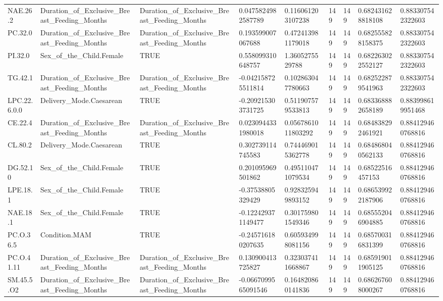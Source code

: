 \begin{longtable}{lllllllll}
NAE.26.2 & Duration\_of\_Exclusive\_Breast\_Feeding\_Months & Duration\_of\_Exclusive\_Breast\_Feeding\_Months & 0.0475824982587789 & 0.116061203107238 & 149 & 149 & 0.682431628818108 & 0.883307542322603 \\
PC.32.0 & Duration\_of\_Exclusive\_Breast\_Feeding\_Months & Duration\_of\_Exclusive\_Breast\_Feeding\_Months & 0.193599007067688 & 0.472413981179018 & 149 & 149 & 0.682555828158375 & 0.883307542322603 \\
PI.32.0 & Sex\_of\_the\_Child.Female & TRUE & 0.558099310648757 & 1.3605275529788 & 149 & 149 & 0.682263022552127 & 0.883307542322603 \\
TG.42.1 & Duration\_of\_Exclusive\_Breast\_Feeding\_Months & Duration\_of\_Exclusive\_Breast\_Feeding\_Months & -0.042158725511814 & 0.102863047780663 & 149 & 149 & 0.682522879541963 & 0.883307542322603 \\
LPC.22.6.0.0 & Delivery\_Mode.Caesarean & TRUE & -0.209215303731725 & 0.511907579533813 & 149 & 149 & 0.683368882658189 & 0.883998619951468 \\
CE.22.4 & Duration\_of\_Exclusive\_Breast\_Feeding\_Months & Duration\_of\_Exclusive\_Breast\_Feeding\_Months & 0.0230944331980018 & 0.0567861011803292 & 149 & 149 & 0.684838292461921 & 0.884129460768816 \\
CL.80.2 & Delivery\_Mode.Caesarean & TRUE & 0.302739114745583 & 0.744469015362778 & 149 & 149 & 0.684868040562133 & 0.884129460768816 \\
DG.52.10 & Sex\_of\_the\_Child.Female & TRUE & 0.201095969501862 & 0.495110471079534 & 149 & 149 & 0.68522516457153 & 0.884129460768816 \\
LPE.18.1 & Sex\_of\_the\_Child.Female & TRUE & -0.37538805329429 & 0.928325949893152 & 149 & 149 & 0.686539922187906 & 0.884129460768816 \\
NAE.18.1 & Sex\_of\_the\_Child.Female & TRUE & -0.122429371149477 & 0.301759801549346 & 149 & 149 & 0.685552046904885 & 0.884129460768816 \\
PC.O.36.5 & Condition.MAM & TRUE & -0.245716180207635 & 0.605934998081156 & 149 & 149 & 0.685700316831399 & 0.884129460768816 \\
PC.O.41.11 & Duration\_of\_Exclusive\_Breast\_Feeding\_Months & Duration\_of\_Exclusive\_Breast\_Feeding\_Months & 0.130900413725827 & 0.323037411668867 & 149 & 149 & 0.685919011905125 & 0.884129460768816 \\
SM.45.5.O2 & Duration\_of\_Exclusive\_Breast\_Feeding\_Months & Duration\_of\_Exclusive\_Breast\_Feeding\_Months & -0.0667099565091546 & 0.164820860141836 & 149 & 149 & 0.686267608000267 & 0.884129460768816 \\

\end{longtable}
